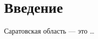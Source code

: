 
\section{Введение}
\begin{frame}{\insertsectionhead}
Саратовская область --- это \ldots
\end{frame}

